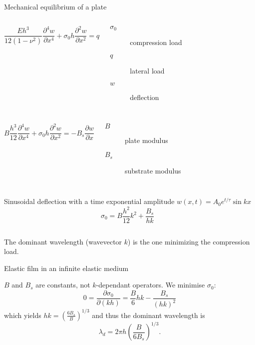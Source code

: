 \begin{frame}{Mechanical equilibrium of a plate}
\begin{columns}
\begin{equation*}
\frac{E h^3}{12(1-\nu^2)}\frac{\partial^4 w}{\partial x^4} + \sigma_0 h \frac{\partial^2 w}{\partial x^2} = q
\end{equation*}
\begin{description}
\item[$\sigma_0$] compression load
\item[$q$] lateral load
\item[$w$] deflection
\end{description}
\end{columns}

\begin{columns}
\begin{equation*}
B\frac{h^3}{12}\frac{\partial^4 w}{\partial x^4} + \sigma_0 h \frac{\partial^2 w}{\partial x^2} = -B_s \frac{\partial w}{\partial x}
\label{eq:mecheq}
\end{equation*}
\begin{description}
\item[$B$] plate modulus
\item[$B_s$] substrate modulus
\end{description}
\end{columns}

\bigskip
\begin{columns}
Sinusoidal deflection with a time exponential amplitude $w(x,t) = A_0 e^{t/\tau} \sin kx$
\begin{equation*}
\sigma_0 = B \frac{h^2}{12} k^2 + \frac{B_s}{hk}
\label{eq:sigma0}
\end{equation*}
\end{columns}

\bigskip
The dominant wavelength (wavevector $k$) is the one minimizing the compression load.

\end{frame}

\begin{frame}{Elastic film in an infinite elastic medium}

$B$ and $B_s$ are constants, not $k$-dependant operators. We minimise $\sigma_0$:
\begin{equation*}
0 = \frac{\partial \sigma_0}{\partial (kh)} = \frac{B}{6} hk -  \frac{B_s}{(hk)^2}
\end{equation*}
which yields $hk = \left(\frac{6B_s}{B}\right)^{1/3}$ and thus the dominant wavelength is
\begin{equation*}
\lambda_d = 2\pi h \left(\frac{B}{6B_s}\right)^{1/3}.
\label{eq:lambdaElEl}
\end{equation*}

\end{frame}


